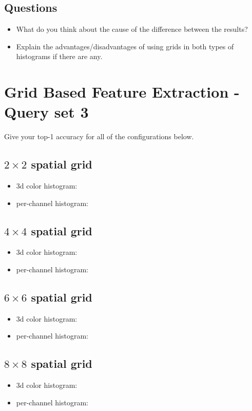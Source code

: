 \documentclass[12pt]{article}
\begin{document}
\subsection{Questions}
\begin{itemize}
\item What do you think about the cause of the difference between the results?
\item Explain the advantages/disadvantages of using grids in both types of histograms if there are any.
\end{itemize}


\section{Grid Based Feature Extraction - Query set 3}
Give your top-1 accuracy for all of the configurations below.

\subsection{$2 \times 2$ spatial grid}
\begin{itemize}
\item 3d color histogram:
\item per-channel histogram:
\end{itemize}

\subsection{$4 \times 4$ spatial grid}
\begin{itemize}
\item 3d color histogram:
\item per-channel histogram:
\end{itemize}

\subsection{$6 \times 6$ spatial grid}
\begin{itemize}
\item 3d color histogram:
\item per-channel histogram:
\end{itemize}

\subsection{$8 \times 8$ spatial grid}
\begin{itemize}
\item 3d color histogram:
\item per-channel histogram:
\end{itemize}
\end{document}
